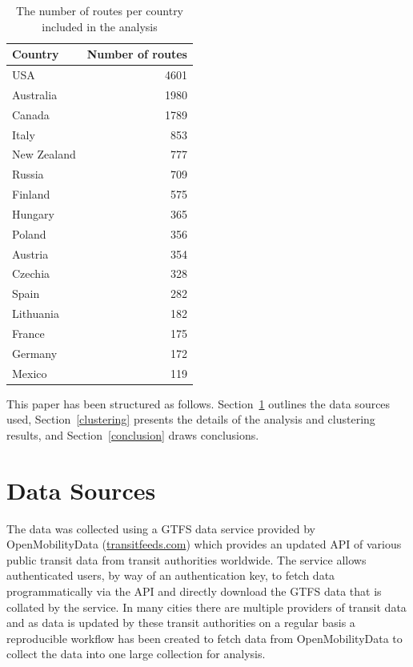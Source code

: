 \documentclass[11pt]{article}
\begin{document}
\begin{table}
	\centering
	\begin{tabular}{ l r }
		\hline
		Country & Number of routes \\
		\hline
		USA         &        4601 \\
		Australia   &        1980 \\
		Canada      &        1789 \\
		Italy       &         853 \\
		New Zealand &         777 \\
		Russia      &         709 \\
		Finland     &         575 \\
		Hungary     &         365 \\
		Poland      &         356 \\
		Austria     &         354 \\
		Czechia     &         328 \\
		Spain       &         282 \\
		Lithuania   &         182 \\
		France      &         175 \\
		Germany     &         172 \\
		Mexico      &         119 \\
		\hline
	\end{tabular}
	\caption{The number of routes per country included in the analysis}	
	\vspace{-1.5cm} %
	\label{tab:num_cities}
\end{table}

This paper has been structured as follows. Section~\ref{data_sources} outlines the data sources used, Section~\ref{clustering} presents the details of the analysis and clustering results, and Section~\ref{conclusion} draws conclusions.




\section{Data Sources}\label{data_sources}

The data was collected using a GTFS data service provided by OpenMobilityData (\url{transitfeeds.com}) which provides an updated API of various public transit data from transit authorities worldwide.  The service allows authenticated users, by way of an authentication key, to fetch data programmatically via the API and directly download the GTFS data that is collated by the service. In many cities there are multiple providers of transit data and as data is updated by these transit authorities on a regular basis a reproducible workflow has been created to fetch data from OpenMobilityData to collect the data into one large collection for analysis.
\end{document}

